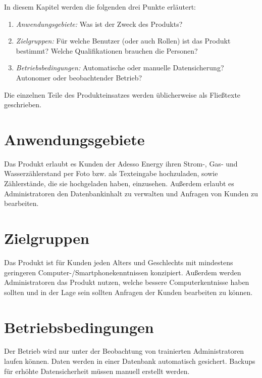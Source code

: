 \begin{tcolorbox}
	In diesem Kapitel werden die folgenden drei Punkte erläutert:
	\begin{enumerate}
		\item \textit{Anwendungsgebiete:} Was ist der Zweck des Produkts?
		\item \textit{Zielgruppen:} Für welche Benutzer (oder auch Rollen) ist das Produkt bestimmt?
		Welche Qualifikationen brauchen die Personen?
		\item \textit{Betriebsbedingungen:} Automatische oder manuelle Datensicherung? 	Autonomer oder beobachtender Betrieb? 	
	\end{enumerate}
	
	\noindent Die einzelnen Teile des Produkteinsatzes werden üblicherweise als Fließtexte geschrieben.
	\end{tcolorbox}
	
	\section{Anwendungsgebiete}
	
	Das Produkt erlaubt es Kunden der Adesso Energy ihren Strom-, Gas- und Wasserzählerstand per Foto bzw. als Texteingabe hochzuladen, sowie Zählerstände, die sie hochgeladen haben, einzusehen.
	Außerdem erlaubt es Administratoren den Datenbankinhalt zu verwalten und Anfragen von Kunden zu bearbeiten.
	
	\section{Zielgruppen}
	
	Das Produkt ist für Kunden jeden Alters und Geschlechts mit mindestens geringeren Computer-/Smartphonekenntnissen konzipiert.
	Außerdem werden Administratoren das Produkt nutzen, welche bessere Computerkentnisse haben sollten und in der Lage sein sollten Anfragen der Kunden bearbeiten zu können.
	
	\section{Betriebsbedingungen}
	
	Der Betrieb wird nur unter der Beobachtung von trainierten Administratoren laufen können. Daten werden in einer Datenbank automatisch gesichert. Backups für erhöhte Datensicherheit müssen manuell erstellt werden.
